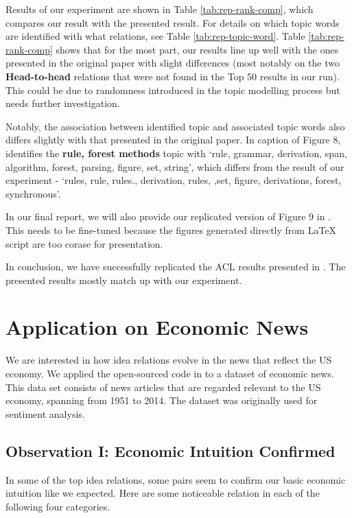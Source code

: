 \documentclass[11pt,a4paper]{article}
\newcommand\boldhead[1]{\textcolor{red-brown}{\textbf{#1}}}
\begin{document}
Results of our experiment are shown in Table \ref{tab:rep-rank-comp}, which compares our result with the presented result. For details on which topic words are identified with what relations, see Table \ref{tab:rep-topic-word}. Table \ref{tab:rep-rank-comp} shows that for the most part, our results line up well with the ones presented in the original paper with slight differences (most notably on the two \boldhead{Head-to-head} relations that were not found in the Top 50 results in our run). This could be due to randomness introduced in the topic modelling process but needs further investigation.

Notably, the association between identified topic and associated topic words also differs slightly with that presented in the original paper. In caption of Figure 8, \citet{chenhao-idea-relations} identifies the \textbf{rule, forest methods} topic with `rule, grammar, derivation, span,
algorithm, forest, parsing, figure, set, string', which differs from the result of our experiment - `rules, rule, rules., derivation, rules, ,set, figure, derivations, forest, synchronous'.

In our final report, we will also provide our replicated version of Figure 9 in \citet{chenhao-idea-relations}. This needs to be fine-tuned because the figures generated directly from LaTeX script are too corase for presentation.

In conclusion, we have successfully replicated the ACL results presented in \citet{chenhao-idea-relations}. The presented results mostly match up with our experiment. 


\section{Application on Economic News}
We are interested in how idea relations evolve in the news that reflect the US economy. We applied the open-sourced code in \citet{chenhao-idea-relations} to a dataset of economic news. This data set \cite{econ-news-dataset} consists of news articles that are regarded relevant to the US economy, spanning from 1951 to 2014. The dataset was originally used for sentiment analysis. 

\subsection{Observation I: Economic Intuition Confirmed}
In some of the top idea relations, some pairs seem to confirm our basic economic intuition like we expected. Here are some noticeable relation in each of the following four categories. 
\end{document}
